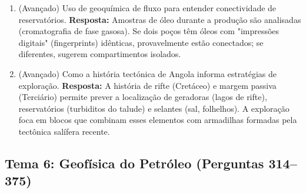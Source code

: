 \documentclass[11pt,a4paper]{article}
\begin{document}
\begin{enumerate}
  \item (Avançado) Uso de geoquímica de fluxo para entender conectividade de reservatórios.
  \textbf{Resposta:} Amostras de óleo durante a produção são analisadas (cromatografia de fase gasosa). Se dois poços têm óleos com "impressões digitais" (fingerprints) idênticas, provavelmente estão conectados; se diferentes, sugerem compartimentos isolados.

  \item (Avançado) Como a história tectónica de Angola informa estratégias de exploração.
  \textbf{Resposta:} A história de rifte (Cretáceo) e margem passiva (Terciário) permite prever a localização de geradoras (lagos de rifte), reservatórios (turbiditos do talude) e selantes (sal, folhelhos). A exploração foca em blocos que combinam esses elementos com armadilhas formadas pela tectônica salífera recente.
\end{enumerate}

\newpage

\subsection*{Tema 6: Geofísica do Petróleo (Perguntas 314–375)}
\end{document}
